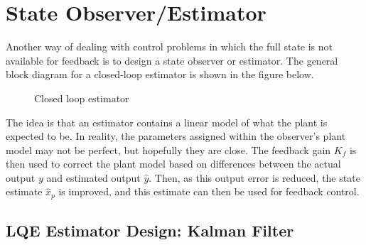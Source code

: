 \section{State Observer/Estimator}

Another way of dealing with control problems in which the full state is not available for feedback is to design a state observer or estimator.
The general block diagram for a closed-loop estimator is shown in the figure below.
\begin{figure}[H]
  \begin{center}
    \caption{Closed loop estimator\label{linear.label_fig_1}}
  \end{center}
\end{figure}
The idea is that an estimator contains a linear model of what the plant is expected to be.
In reality, the parameters assigned within the observer's plant model may not be perfect, but hopefully they are close.
The feedback gain $K_{f}$ is then used to correct the plant model based on differences between the actual output $y$ and estimated output $\hat{y}$.
Then, as this output error is reduced, the state estimate $\hat{x}_{p}$ is improved, and this estimate can then be used for feedback control.

\subsection{LQE Estimator Design: Kalman Filter}

